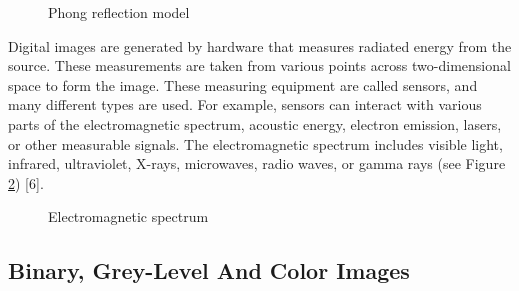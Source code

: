 \begin{figure}[htbp]
\centering
{}
\caption{Phong reflection model \cite{kurihara2012shading}}
\label{fig:PhongReflectionModel}
\end{figure}

Digital images are generated by hardware that measures radiated energy from the source. These measurements are taken from various points across two-dimensional space to form the image. These measuring equipment are called sensors, and many different types are used. For example, sensors can interact with various parts of the electromagnetic spectrum, acoustic energy, electron emission, lasers, or other measurable signals. The electromagnetic spectrum includes visible light, infrared, ultraviolet, X-rays, microwaves, radio waves, or gamma rays (see Figure \ref{fig:EMSpectrumcolor}) [6].

\begin{figure}[htbp]
\centering
{}
\caption{Electromagnetic spectrum \cite{ElectromagneticSpectrum}}
\label{fig:EMSpectrumcolor}
\end{figure}

\subsection{Binary, Grey-Level And Color Images}


